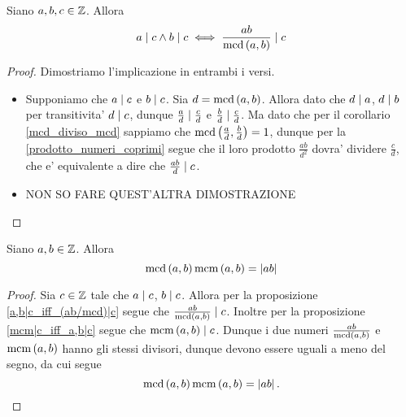 \begin{proposition}\label{a,b|c_iff_(ab/mcd)|c}
    Siano $a, b, c \in \mathbb{Z}$. Allora \begin{equation}
        a \mid c \land b \mid c \iff \frac{ab}{\operatorname{mcd}\left(a, b\right)} \mid c
    \end{equation}
\end{proposition}
\begin{proof}
    Dimostriamo l'implicazione in entrambi i versi.
    \begin{itemize}
        \item Supponiamo che $a \mid c$ e $b \mid c$. Sia $d = \operatorname{mcd}\left(a, b\right)$. Allora dato che $d \mid a$, $d \mid b$ per transitivita' $d \mid c$, dunque $\frac{a}{d} \mid \frac{c}{d}$ e $\frac{b}{d} \mid \frac{c}{d}$. Ma dato che per il corollario \ref{mcd_diviso_mcd} sappiamo che $\operatorname{mcd}\left(\frac{a}{d}, \frac{b}{d}\right) = 1$, dunque per la \ref{prodotto_numeri_coprimi} segue che il loro prodotto $\frac{ab}{d^2}$ dovra' dividere $\frac{c}{d}$, che e' equivalente a dire che $\frac{ab}{d} \mid c$.
        \item NON SO FARE QUEST'ALTRA DIMOSTRAZIONE
    \end{itemize}
\end{proof}

\begin{proposition}
    \label{mcm*mcd=ab}
    Siano $a, b \in \mathbb{Z}$. Allora
    \begin{equation}
        \operatorname{mcd}\left(a, b\right)\operatorname{mcm}\left(a, b\right) = \left|ab\right|
    \end{equation}
\end{proposition}
\begin{proof}
    Sia $c \in \mathbb{Z}$ tale che $a \mid c$, $b \mid c$. Allora per la proposizione \ref{a,b|c_iff_(ab/mcd)|c} segue che $\frac{ab}{\operatorname{mcd}\left(a, b\right)} \mid c$. Inoltre per la proposizione \ref{mcm|c_iff_a,b|c} segue che $\operatorname{mcm}\left(a, b\right) \mid c$.
    Dunque i due numeri $\frac{ab}{\operatorname{mcd}\left(a, b\right)}$ e $\operatorname{mcm}\left(a, b\right)$ hanno gli stessi divisori, dunque devono essere uguali a meno del segno, da cui segue \[
        \operatorname{mcd}\left(a, b\right)\operatorname{mcm}\left(a, b\right) = \left|ab\right|. 
    \]
\end{proof}